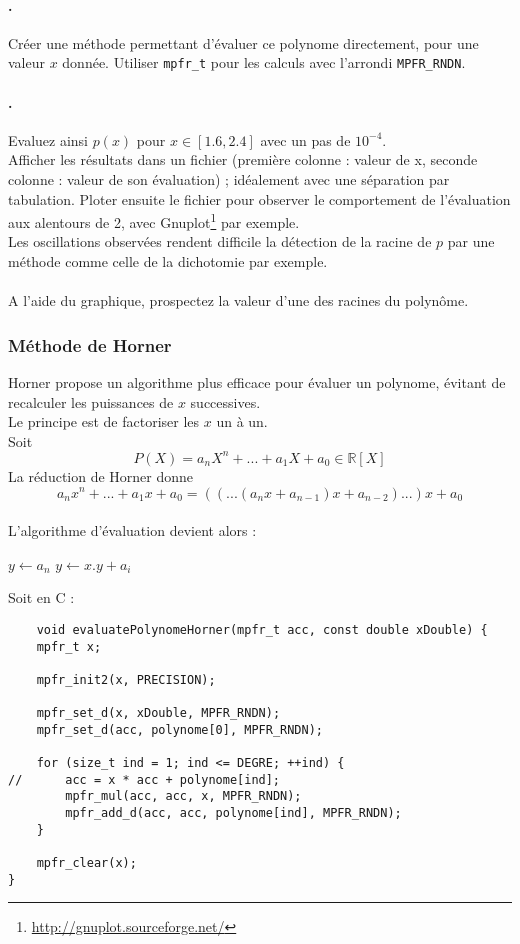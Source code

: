 \documentclass[a4paper,11pt]{exam}
\begin{document}
\paragraph{\theenumii.} Créer une méthode permettant d'évaluer ce polynome directement, pour une valeur $x$ donnée. Utiliser \verb=mpfr_t= pour les calculs avec l'arrondi \verb=MPFR_RNDN=.

\paragraph{\theenumii.} Evaluez ainsi $p(x)$ pour $x \in \left[ 1.6,2.4 \right]$ avec un pas de $10^{-4}$. \\
Afficher les résultats dans un fichier (première colonne : valeur de x, seconde colonne : valeur de son évaluation) ; idéalement avec une séparation par tabulation. Ploter ensuite le fichier pour observer le comportement de l'évaluation aux alentours de 2, avec Gnuplot\footnote{\url{http://gnuplot.sourceforge.net/}} par exemple.\\
Les oscillations observées rendent difficile la détection de la racine de $p$ par une méthode comme celle de la dichotomie par exemple.\\
\\A l'aide du graphique, prospectez la valeur d'une des racines du polynôme.

\subsubsection{Méthode de Horner}
\setcounter{enumii}{1}
Horner propose un algorithme plus efficace pour évaluer un polynome, évitant de recalculer les puissances de $x$ successives.\\
Le principe est de factoriser les $x$ un à un. \\
Soit \[ P\left(X\right) = a_{n}X^{n}+...+a_{1}X +  a_{0} \in  \mathbb{R}\left[ X\right] \]
La réduction de Horner donne
\[a_{n}x^{n}+...+a_{1}x + a_{0} = ((...(a_{n}x+a_{n-1})x+a_{n-2})...)x+a_{0} \]
\\ 
L'algorithme d'évaluation devient alors :\\
\begin{algorithmic}
 	\State $y\gets a_{n}$
 		\State $y\gets x.y+a_{i}$
 \EndFor
\end{algorithmic}

Soit en C :
\begin{lstlisting}
	void evaluatePolynomeHorner(mpfr_t acc, const double xDouble) {
	mpfr_t x;

	mpfr_init2(x, PRECISION);

	mpfr_set_d(x, xDouble, MPFR_RNDN);
	mpfr_set_d(acc, polynome[0], MPFR_RNDN);

	for (size_t ind = 1; ind <= DEGRE; ++ind) {
//		acc = x * acc + polynome[ind];
		mpfr_mul(acc, acc, x, MPFR_RNDN);
		mpfr_add_d(acc, acc, polynome[ind], MPFR_RNDN);
	}

	mpfr_clear(x);
}
\end{lstlisting}
\end{document}
